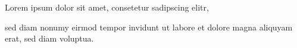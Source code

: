 \documentclass{article}
\begin{document}
\beginnumbering
\pstart
Lorem ipsum dolor sit amet, consetetur sadipscing elitr,  sed diam nonumy eirmod tempor invidunt ut labore et dolore magna aliquyam erat, sed diam voluptua. 
\pend
\endnumbering
\end{document}
